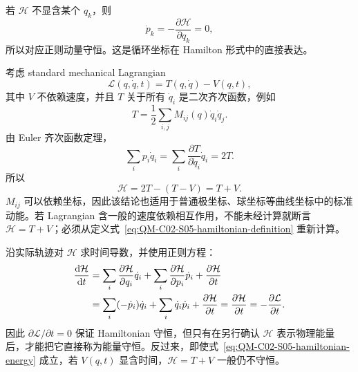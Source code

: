 若 $\mathcal H$ 不显含某个 $q_k$，则
\begin{equation}
  \dot p_k=-\frac{\partial\mathcal H}{\partial q_k}=0,
  \label{eq:QM-C02-S05-cyclic-hamiltonian}
\end{equation}
所以对应正则动量守恒。这是循环坐标在 Hamilton 形式中的直接表达。


考虑 standard mechanical Lagrangian
\begin{equation}
  \mathcal L(q,\dot q,t)=T(q,\dot q)-V(q,t),
  \label{eq:QM-C02-S05-standard-mechanical-lagrangian}
\end{equation}
其中 $V$ 不依赖速度，并且 $T$ 关于所有 $\dot q_i$ 是二次齐次函数，例如
\begin{equation}
  T=\frac12\sum_{i,j}M_{ij}(q)\dot q_i\dot q_j.
  \label{eq:QM-C02-S05-quadratic-kinetic-energy}
\end{equation}
由 Euler 齐次函数定理，
\begin{equation}
  \sum_i p_i\dot q_i
  =\sum_i\frac{\partial T}{\partial\dot q_i}\dot q_i
  =2T.
  \label{eq:QM-C02-S05-euler-homogeneous}
\end{equation}
所以
\begin{equation}
  \boxed{
  \mathcal H=2T-(T-V)=T+V.}
  \label{eq:QM-C02-S05-hamiltonian-energy}
\end{equation}
$M_{ij}$ 可以依赖坐标，因此该结论也适用于普通极坐标、球坐标等曲线坐标中的标准动能。若 Lagrangian 含一般的速度依赖相互作用，不能未经计算就断言 $\mathcal H=T+V$；必须从定义式~\eqref{eq:QM-C02-S05-hamiltonian-definition} 重新计算。

沿实际轨迹对 $\mathcal H$ 求时间导数，并使用正则方程：
\begin{align}
  \frac{\mathop{}\!\mathrm{d}\mathcal H}{\mathop{}\!\mathrm{d} t}
  &=\sum_i\frac{\partial\mathcal H}{\partial q_i}\dot q_i
    +\sum_i\frac{\partial\mathcal H}{\partial p_i}\dot p_i
    +\frac{\partial\mathcal H}{\partial t} \notag\\
  &=\sum_i(-\dot p_i)\dot q_i
    +\sum_i\dot q_i\dot p_i
    +\frac{\partial\mathcal H}{\partial t}
   =\frac{\partial\mathcal H}{\partial t}
   =-\frac{\partial\mathcal L}{\partial t}.
  \label{eq:QM-C02-S05-hamiltonian-time-derivative}
\end{align}
因此 $\partial\mathcal L/\partial t=0$ 保证 Hamiltonian 守恒，但只有在另行确认 $\mathcal H$ 表示物理能量后，才能把它直接称为能量守恒。反过来，即使式~\eqref{eq:QM-C02-S05-hamiltonian-energy} 成立，若 $V(q,t)$ 显含时间，$\mathcal H=T+V$ 一般仍不守恒。

